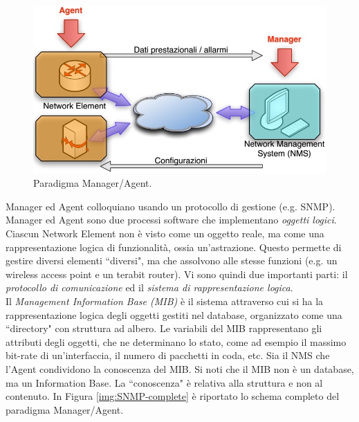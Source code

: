 \begin{figure}[htbp]
	\centering
	\includegraphics[scale = 0.55]{images/SNMP-abstraction}
	\caption{Paradigma Manager/Agent.}
	\label{img:SNMP-abstraction}
\end{figure}
Manager ed Agent colloquiano usando un protocollo di gestione (e.g. SNMP). Manager ed Agent sono due processi software che implementano \textit{oggetti logici}. Ciascun Network Element non è visto come un oggetto reale, ma come una rappresentazione logica di funzionalità, ossia un'astrazione. Questo permette di gestire diversi elementi \textquotedblleft diversi", ma che assolvono alle stesse funzioni (e.g. un wireless access point e un terabit router). Vi sono quindi due importanti parti: il \textit{protocollo di comunicazione} ed il \textit{sistema di rappresentazione logica}.\\
Il \textit{Management Information Base (MIB)} è il sistema attraverso cui si ha la rappresentazione logica degli oggetti gestiti nel database, organizzato come una \textquotedblleft directory" con struttura ad albero. Le variabili del MIB rappresentano gli attributi degli oggetti, che ne determinano lo stato, come ad esempio il massimo bit-rate di un'interfaccia, il numero di pacchetti in coda, etc. Sia il NMS che l'Agent condividono la conoscenza del MIB. Si noti che il MIB non è un database, ma un Information Base. La \textquotedblleft conoscenza" è relativa alla struttura e non al contenuto. In Figura \ref{img:SNMP-complete} è riportato lo schema completo del paradigma Manager/Agent.

